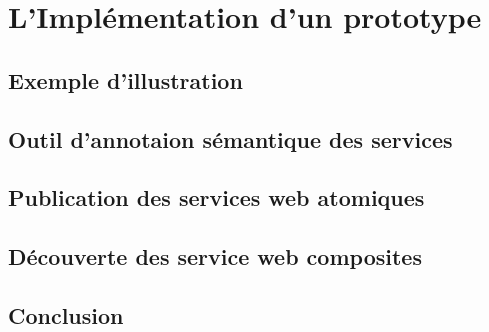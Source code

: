\chapter{L'Implémentation d'un prototype}

\section{Exemple d'illustration}
\label{sec:example-dill-5}
\section{Outil d'annotaion sémantique des services}
\label{sec:outil-dann-semant}
\section{Publication des services web atomiques}
\label{sec:atomic-publication}
\section{Découverte des service web composites}
\label{sec:composite-discovery}
\section{Conclusion}
\label{sec:Conclusion}

